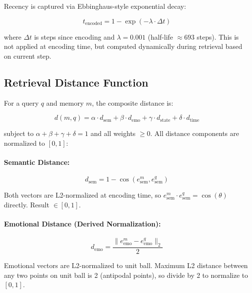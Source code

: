 \documentclass[10pt,twocolumn,letterpaper]{article}
\begin{document}
Recency is captured via Ebbinghaus-style exponential decay:

\begin{equation}
t_{\text{encoded}} = 1 - \exp(-\lambda \cdot \Delta t)
\end{equation}

where $\Delta t$ is steps since encoding and $\lambda = 0.001$ (half-life $\approx 693$ steps). This is not applied at encoding time, but computed dynamically during retrieval based on current step.

\subsection{Retrieval Distance Function}
\label{sec:retrieval_distance}

For a query $q$ and memory $m$, the composite distance is:

\begin{equation}
d(m, q) = \alpha \cdot d_{\text{sem}} + \beta \cdot d_{\text{emo}} + \gamma \cdot d_{\text{state}} + \delta \cdot d_{\text{time}}
\label{eq:composite_distance}
\end{equation}

subject to $\alpha + \beta + \gamma + \delta = 1$ and all weights $\geq 0$. All distance components are normalized to $[0, 1]$:

\paragraph{Semantic Distance:}
\begin{equation}
d_{\text{sem}} = 1 - \cos(e^m_{\text{sem}}, e^q_{\text{sem}})
\end{equation}

Both vectors are L2-normalized at encoding time, so $e^m_{\text{sem}} \cdot e^q_{\text{sem}} = \cos(\theta)$ directly. Result $\in [0, 1]$.

\paragraph{Emotional Distance (Derived Normalization):}
\begin{equation}
d_{\text{emo}} = \frac{\|e^m_{\text{emo}} - e^q_{\text{emo}}\|_2}{2}
\end{equation}

Emotional vectors are L2-normalized to unit ball. Maximum L2 distance between any two points on unit ball is 2 (antipodal points), so divide by 2 to normalize to $[0, 1]$.
\end{document}
